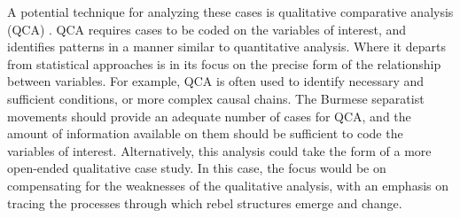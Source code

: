 A potential technique for analyzing these cases is qualitative comparative analysis (QCA) \citep{Ragin2000}. QCA requires cases to be coded on the variables of interest, and identifies patterns in a manner similar to quantitative analysis. Where it departs from statistical approaches is in its focus on the precise form of the relationship between variables. For example, QCA is often used to identify necessary and sufficient conditions, or more complex causal chains. The Burmese separatist movements should provide an adequate number of cases for QCA, and the amount of information available on them should be sufficient to code the variables of interest. Alternatively, this analysis could take the form of a more open-ended qualitative case study. In this case, the focus would be on compensating for the weaknesses of the qualitative analysis, with an emphasis on tracing the processes through which rebel structures emerge and change.